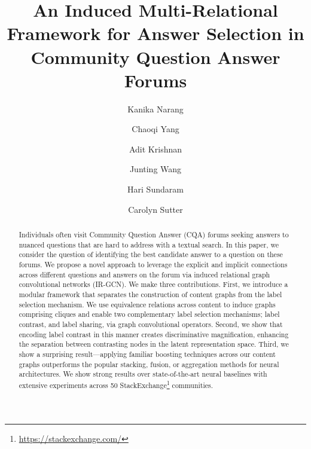 \documentclass[smallcondensed]{svjour3}     %
\begin{document}
%
\title{An Induced Multi-Relational Framework for Answer Selection in Community Question Answer Forums}
%
%
\author{Kanika Narang \and Chaoqi Yang \and Adit Krishnan \and Junting Wang \and Hari Sundaram \and Carolyn Sutter}
%
\maketitle              %
%
\begin{abstract}
Individuals often visit Community Question Answer (CQA) forums seeking answers to nuanced questions that are hard to address with a textual search. In this paper, we consider the question of identifying the best candidate answer to a question on these forums. We propose a novel approach to leverage the explicit and implicit connections across different questions and answers on the forum via induced relational graph convolutional networks (IR-GCN). We make three contributions. First, we introduce a modular framework that separates the construction of content graphs from the label selection mechanism. We use equivalence relations across content to induce graphs comprising cliques and enable two complementary label selection mechanisms; label contrast, and label sharing, via graph convolutional operators. Second, we show that encoding label contrast in this manner creates discriminative magnification, enhancing the separation between contrasting nodes in the latent representation space. Third, we show a surprising result---applying familiar boosting techniques across our content graphs outperforms the popular stacking, fusion, or aggregation methods for neural architectures. We show strong results over state-of-the-art neural baselines with extensive experiments across 50 StackExchange\footnote{\url{https://stackexchange.com/}} communities.
\end{abstract}
%
%
%









%
%
%
%
%
\small


\end{document}
